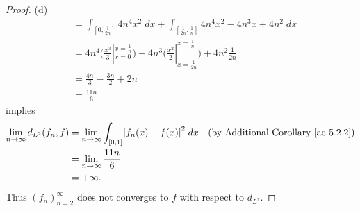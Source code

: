 \begin{proof}{(d)}
\begin{align*}
         & = \int_{[0, \frac{1}{2n}]} 4 n^4 x^2 \; dx + \int_{[\frac{1}{2n}, \frac{1}{n}]} 4 n^4 x^2 - 4 n^3 x + 4n^2 \; dx                                       \\
         & = 4n^4 \bigg(\frac{x^3}{3}|_{x = 0}^{x = \frac{1}{n}}\bigg) - 4n^3 \bigg(\frac{x^2}{2}|_{x = \frac{1}{2n}}^{x = \frac{1}{n}}\bigg) + 4n^2 \frac{1}{2n} \\
         & = \frac{4n}{3} - \frac{3n}{2} + 2n                                                                                                                     \\
         & = \frac{11n}{6}
    \end{align*}
    implies
    \begin{align*}
        \lim_{n \to \infty} d_{L^2}(f_n, f) & = \lim_{n \to \infty} \int_{[0, 1]} \abs*{f_n(x) - f(x)}^2 \; dx & \text{(by Additional Corollary \ref{ac 5.2.2})} \\
                                            & = \lim_{n \to \infty} \frac{11n}{6}                                                                                \\
                                            & = +\infty.
    \end{align*}
    Thus \((f_n)_{n = 2}^\infty\) does not converges to \(f\) with respect to \(d_{L^2}\).
\end{proof}